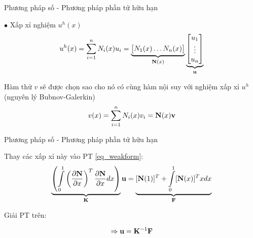 \documentclass[aspectratio=169, t]{beamer} %
\begin{document}
\begin{frame}{Phương pháp số - Phương pháp phần tử hữu hạn}

\vspace{3mm}
$\bullet$ Xấp xỉ nghiệm $u^h(x)$
\begin{equation}\label{eq_interpolation}
    u^h(x) = \sum\limits_{i=1}^n N_i(x) u_i = \underbrace{\begin{bmatrix}
        N_1(x) \dots N_n(x)
    \end{bmatrix}}_{{\bf N}(x)} \underbrace{\begin{bmatrix}
        u_1 \\ \vdots \\ u_n 
    \end{bmatrix}}_{\bf u}
\end{equation}

Hàm thử $v$ sẽ được chọn sao cho nó có cùng hàm nội suy với nghiệm xấp xỉ $u^h$ (nguyên lý Bubnov-Galerkin)
\begin{equation}\label{eq_interpolation_test}
    v(x) = \sum\limits_{i=1}^n N_i(x) v_i = {{\bf N}(x)}{\bf v}
\end{equation}
\end{frame}

\begin{frame}{Phương pháp số - Phương pháp phần tử hữu hạn}

\vspace{10mm}

Thay các xấp xỉ này vào PT \ref{eq_weakform}:
\begin{equation}\label{eq_matrixform}
    \underbrace{\left(\int\limits_0^1\left(\frac{\partial{\bf N}}{\partial x}\right)^T\frac{\partial{\bf N}}{\partial x} dx\right)}_{\bf K}{\bf u} = \underbrace{[{\bf N}(1)]^T + \int\limits_0^1 [{\bf N}(x)]^Tx dx}_{\bf F} 
\end{equation}

Giải PT trên:

\begin{equation}
    \Rightarrow {\bf u} = {\bf K}^{-1}{\bf F}
\end{equation}
\end{frame}
\end{document}
